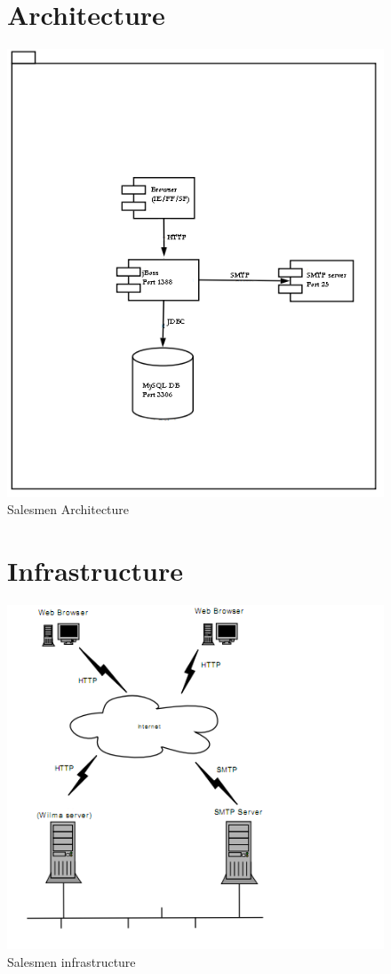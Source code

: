 \documentclass[salesmen, twoside]{../../../templates/latex/2009/softproj}
\begin{document}
\begin{projdoc}
\begin{figure}
\section{Architecture}
\label{fig_architecture}
\includegraphics[scale=0.7]{../../img/archi1.png}
\caption{Salesmen Architecture}
\end{figure}

\begin{figure}
\section{Infrastructure}
\label{fig_infrastructure}
\includegraphics[scale=0.8]{../../img/infra1.png}
\caption{Salesmen infrastructure}
\end{figure}


\end{projdoc}
\end{document}
